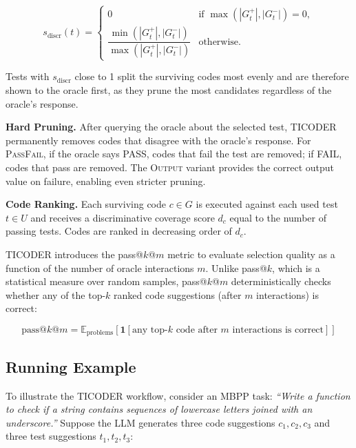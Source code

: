 \documentclass[conference]{IEEEtran}
\begin{document}
\begin{equation}
    s_{\text{discr}}(t) = \begin{cases}
        0 & \text{if } \max(|G_t^+|, |G_t^-|) = 0, \\[4pt]
        \dfrac{\min(|G_t^+|, |G_t^-|)}{\max(|G_t^+|, |G_t^-|)} & \text{otherwise.}
    \end{cases}
    \label{eq:sdiscr}
\end{equation}

Tests with $s_{\text{discr}}$ close to 1 split the surviving codes most evenly and are therefore shown to the oracle first, as they prune the most candidates regardless of the oracle's response.

\textbf{Hard Pruning.} After querying the oracle about the selected test, TICODER permanently removes codes that disagree with the oracle's response. For \textsc{PassFail}, if the oracle says PASS, codes that fail the test are removed; if FAIL, codes that pass are removed. The \textsc{Output} variant provides the correct output value on failure, enabling even stricter pruning.

\textbf{Code Ranking.} Each surviving code $c \in G$ is executed against each used test $t \in U$ and receives a discriminative coverage score $d_c$ equal to the number of passing tests. Codes are ranked in decreasing order of $d_c$.

TICODER introduces the pass@$k$@$m$ metric to evaluate selection quality as a function of the number of oracle interactions $m$. Unlike pass@$k$, which is a statistical measure over random samples, pass@$k$@$m$ deterministically checks whether any of the top-$k$ ranked code suggestions (after $m$ interactions) is correct:

\begin{equation}
    \text{pass@}k\text{@}m = \mathbb{E}_{\text{problems}} \left[ \mathbf{1}[\text{any top-}k \text{ code after } m \text{ interactions is correct}] \right]
\end{equation}

\subsection{Running Example}

To illustrate the TICODER workflow, consider an MBPP task: \emph{``Write a function to check if a string contains sequences of lowercase letters joined with an underscore.''}  Suppose the LLM generates three code suggestions $c_1, c_2, c_3$ and three test suggestions $t_1, t_2, t_3$:
\end{document}
